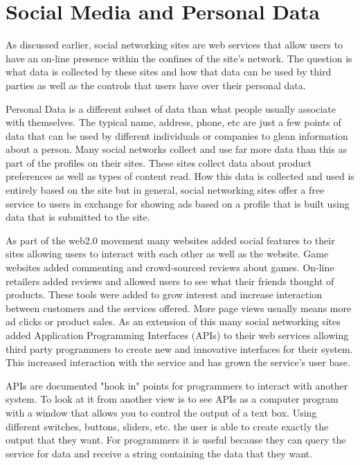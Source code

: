 \section{Social Media and Personal Data}
As discussed earlier, social networking sites are web services that allow users
to have an on-line presence within the confines of the site's network. The question
is what data is collected by these sites and how that data can be used by third
parties as well as the controls that users have over their personal data.

Personal Data is a different subset of data than what people usually associate
with themselves. The typical name, address, phone, etc are just a few points of data
that can be used by different individuals or companies to glean information
about a person. Many social networks collect and use far more data than this as
part of the profiles on their sites. These sites collect data about product
preferences as well as types of content read. How this data is collected and used is
entirely based on the site but in general, social networking sites offer a free
service to users in exchange for showing ads based on a profile that is built
using data that is submitted to the site.

As part of the web2.0 movement many websites added social features to their
sites allowing users to interact with each other as well as the website. Game 
websites added commenting and crowd-sourced reviews about games. On-line
retailers added reviews and allowed users to see what their friends thought of
products. These tools were added to grow interest and increase interaction
between customers and the services offered. More page views usually means more
ad clicks or product sales. As an extension of this many social networking sites
added Application Programming Interfaces (APIs) to their web services allowing
third party programmers to create new and innovative interfaces for their system.
This increased interaction with the service and has grown the service's user base.

APIs are documented "hook in" points for programmers to interact with another
system. To look at it from another view is to see APIs as a computer program
with a window that allows you to control the output of a text box. Using
different switches, buttons, sliders, etc. the user is able to create exactly
the output that they want. For programmers it is useful because they can query
the service for data and receive a string containing the data that they want.

